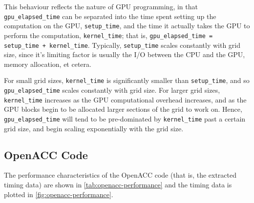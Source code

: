 \documentclass{article}
\begin{document}
This behaviour reflects the nature of GPU programming, in that
\lstinline{gpu_elapsed_time} can be separated into the time spent setting up the
computation on the GPU, \lstinline{setup_time}, and the time it actually takes
the GPU to perform the computation, \lstinline{kernel_time}; that is,
\lstinline{gpu_elapsed_time = setup_time + kernel_time}.
Typically, \lstinline{setup_time} scales constantly with grid size, since it's
limiting factor is usually the I/O between the CPU and the GPU, memory
allocation, et cetera.

For small grid sizes, \lstinline{kernel_time} is significantly smaller than
\lstinline{setup_time}, and so \lstinline{gpu_elapsed_time} scales constantly
with grid size.
For larger grid sizes, \lstinline{kernel_time} increases as the GPU
computational overhead increases, and as the GPU blocks begin to be allocated
larger sections of the grid to work on.
Hence, \lstinline{gpu_elapsed_time} will tend to be pre-dominated by
\lstinline{kernel_time} past a certain grid size, and begin scaling
exponentially with the grid size.

\clearpage
\subsection{OpenACC Code}
\label{sec:cpu-code}

The performance characteristics of the OpenACC code (that is, the extracted
timing data) are shown in \autoref{tab:openacc-performance} and the timing data is
plotted in \autoref{fig:openacc-performance}.

\begin{table}[h]
  \begin{center}
  \end{center}
  \caption[Performance characteristics of OpenACC code.]{
    Performance characteristics of OpenACC code, compiled with
    \lstinline[language=bash]{-02}, and with debugging statements turned off.
    All times are presented in units of \si{\ms}.
  }
  \label{tab:openacc-performance}
\end{table}
\end{document}
